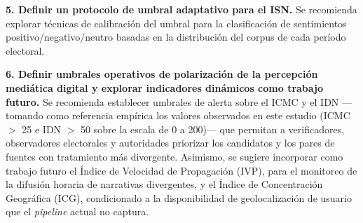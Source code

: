 \textbf{5. Definir un protocolo de umbral adaptativo para el ISN.} Se recomienda explorar técnicas de calibración del umbral para la clasificación de sentimientos positivo/negativo/neutro basadas en la distribución del corpus de cada período electoral.

\textbf{6. Definir umbrales operativos de polarización de la percepción mediática digital y explorar indicadores dinámicos como trabajo futuro.} Se recomienda establecer umbrales de alerta sobre el ICMC y el IDN —tomando como referencia empírica los valores observados en este estudio (ICMC $>$ 25 e IDN $>$ 50 sobre la escala de 0 a 200)— que permitan a verificadores, observadores electorales y autoridades priorizar los candidatos y los pares de fuentes con tratamiento más divergente. Asimismo, se sugiere incorporar como trabajo futuro el Índice de Velocidad de Propagación (IVP), para el monitoreo de la difusión horaria de narrativas divergentes, y el Índice de Concentración Geográfica (ICG), condicionado a la disponibilidad de geolocalización de usuario que el \textit{pipeline} actual no captura.
